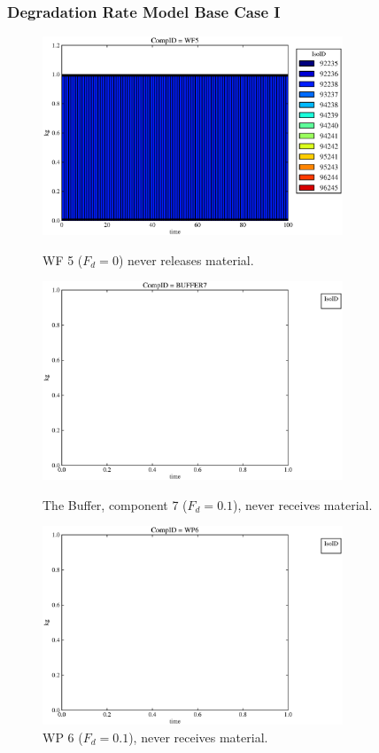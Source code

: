 \begin{frame}
  \frametitle{Degradation Rate Model Base Case I}
  \begin{figure}

\begin{minipage}[b]{0.45\linewidth}

  \includegraphics[width=0.8\textwidth]{./images/drI1.eps}
  \caption[DRI WF Contaminants.]{
    WF 5 ($F_d = 0$) never releases material.
    }
  \label{fig:drIwf5}
  
  \includegraphics[width=0.8\textwidth]{./images/drI3.eps}
  \caption[Case DRI Buffer Contaminants]{
    The Buffer, component 7 ($F_d = 0.1$), never receives material.
    }
  \label{fig:drIbuff}

\end{minipage}
\hspace{0.05\linewidth}
\begin{minipage}[b]{0.45\linewidth}
  \includegraphics[width=0.8\textwidth]{./images/drI2.eps}
  \caption[Case DRI WP Contaminants.]{ 
    WP 6 ($F_d = 0.1$), never receives material.
    }
  \label{fig:drIwp6}


\end{minipage}
\end{figure}
\end{frame}
